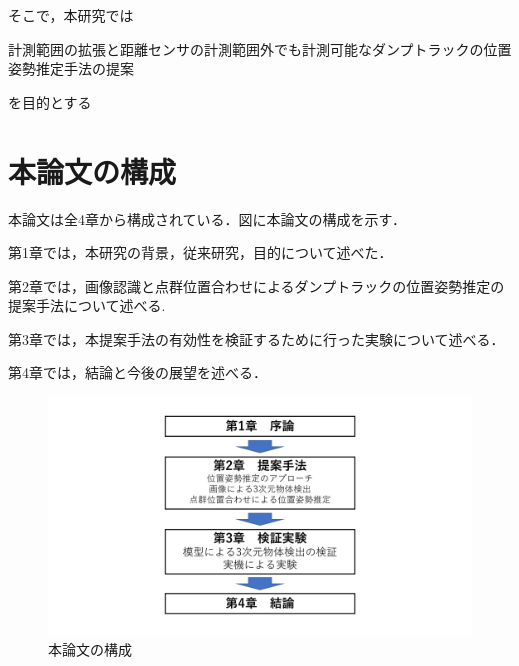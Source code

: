 \par
そこで，本研究では
    \begin{screen}
        \begin{center}
        計測範囲の拡張と距離センサの計測範囲外でも計測可能なダンプトラックの位置姿勢推定手法の提案
        \end{center}
    \end{screen}
を目的とする
\newpage
\section{本論文の構成}
本論文は全4章から構成されている．図に本論文の構成を示す．\par
第1章では，本研究の背景，従来研究，目的について述べた．\par
第2章では，画像認識と点群位置合わせによるダンプトラックの位置姿勢推定の提案手法について述べる.\par
第3章では，本提案手法の有効性を検証するために行った実験について述べる．\par
第4章では，結論と今後の展望を述べる．
\begin{figure}[b]
    \begin{center}
    \includegraphics[width=0.3 \columnwidth]{./chap1/fig/struct.jpg}
    \caption{本論文の構成}
    \label{fig:flow}
    \end{center}
\end{figure}

